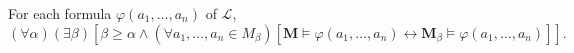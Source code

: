For each formula $\varphi(a_1, \ldots, a_n)$ of $\mathcal{L}$,
$$(\forall \alpha)(\exists \beta)[\beta \geq \alpha \land (\forall a_1, \ldots, a_n \in M_\beta)[\mathbf{M} \models \varphi(a_1, \ldots, a_n) \leftrightarrow \mathbf{M}_\beta \models \varphi(a_1, \ldots, a_n)]].$$
